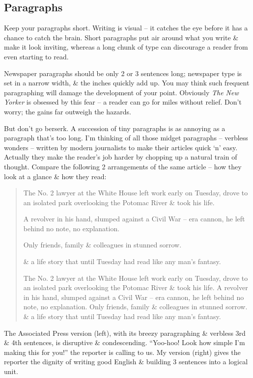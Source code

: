 \documentclass{article}
\begin{document}
\subsection{Paragraphs}
Keep your paragraphs short. Writing is visual -- it catches the eye before it has a chance to catch the brain. Short paragraphs put air around what you write \& make it look inviting, whereas a long chunk of type can discourage a reader from even starting to read.

Newspaper paragraphs should be only 2 or 3 sentences long; newspaper type is set in a narrow width, \& the inches quickly add up. You may think such frequent paragraphing will damage the development of your point. Obviously \textit{The New Yorker} is obsessed by this fear -- a reader can go for miles without relief. Don't worry; the gains far outweigh the hazards.

But don't go berserk. A succession of tiny paragraphs is as annoying as a paragraph that's too long. I'm thinking of all those midget paragraphs -- verbless wonders -- written by modern journalists to make their articles quick `n' easy. Actually they make the reader's job harder by chopping up a natural train of thought. Compare the following 2 arrangements of the same article -- how they look at a glance \& how they read:
\begin{quotation}
	The No. 2 lawyer at the White House left work early on Tuesday, drove to an isolated park overlooking the Potomac River \& took his life.
	
	A revolver in his hand, slumped against a Civil War -- era cannon, he left behind no note, no explanation.
	
	Only friends, family \& colleagues in stunned sorrow.
	
	\& a life story that until Tuesday had read like any man's fantasy.
	
	The No. 2 lawyer at the White House left work early on Tuesday, drove to an isolated park overlooking the Potomac River \& took his life. A revolver in his hand, slumped against a Civil War -- era cannon, he left behind no note, no explanation. Only friends, family \& colleagues in stunned sorrow. \& a life story that until Tuesday had read like any man's fantasy.
\end{quotation}
The Associated Press version (left), with its breezy paragraphing \& verbless 3rd \& 4th sentences, is disruptive \& condescending. ``Yoo-hoo! Look how simple I'm making this for you!'' the reporter is calling to us. My version (right) gives the reporter the dignity of writing good English \& building 3 sentences into a logical unit.
\end{document}
